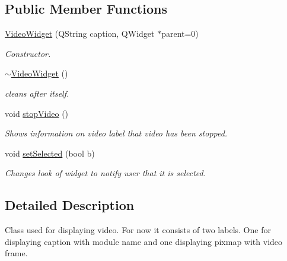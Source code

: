 \subsection*{Public Member Functions}
\begin{DoxyCompactItemize}
\item 
\hyperlink{class_video_widget_ae680c5ae93ec4a7af13bf24ed431660a}{VideoWidget} (QString caption, QWidget $\ast$parent=0)
\begin{DoxyCompactList}\small\item\em Constructor. \item\end{DoxyCompactList}\item 
\hypertarget{class_video_widget_a77b8af4076f462cb5db7932e88d46829}{
\hyperlink{class_video_widget_a77b8af4076f462cb5db7932e88d46829}{$\sim$VideoWidget} ()}
\label{db/df7/class_video_widget_a77b8af4076f462cb5db7932e88d46829}

\begin{DoxyCompactList}\small\item\em cleans after itself. \item\end{DoxyCompactList}\item 
\hypertarget{class_video_widget_a7cd8b0959b43587884972e2076fb05d2}{
void \hyperlink{class_video_widget_a7cd8b0959b43587884972e2076fb05d2}{stopVideo} ()}
\label{db/df7/class_video_widget_a7cd8b0959b43587884972e2076fb05d2}

\begin{DoxyCompactList}\small\item\em Shows information on video label that video has been stopped. \item\end{DoxyCompactList}\item 
void \hyperlink{class_video_widget_a094692eefb7ee61a6f066acc8abddc45}{setSelected} (bool b)
\begin{DoxyCompactList}\small\item\em Changes look of widget to notify user that it is selected. \item\end{DoxyCompactList}\end{DoxyCompactItemize}


\subsection{Detailed Description}
Class used for displaying video. For now it consists of two labels. One for displaying caption with module name and one displaying pixmap with video frame. 

